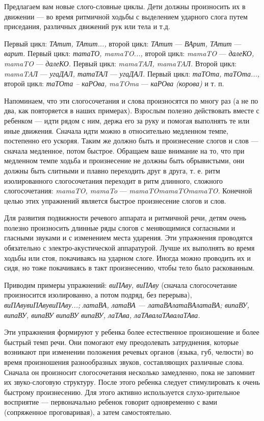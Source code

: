 \documentclass{book}
\renewcommand{\emph}[1]{\textit{#1}}
\begin{document}
Предлагаем вам новые слого-словные циклы. Дети должны произносить их в
движении --- во время ритмичной ходьбы с выделением ударного слога путем
приседания, различных движений рук или тела и т.д.

Первый цикл: \emph{ТАтит, ТАтит...,} второй цикл: \emph{ТАтит} ---
\emph{ВАрит, ТАтит} --- \emph{варит.} Первый цикл: \emph{татаТО,
mamaTO...,} второй цикл: \emph{mamaTO} --- \emph{далеКО, mamaTO} ---
\emph{далеКО.} Первый цикл: \emph{mamaTAЛ, mamaTAЛ.} Второй цикл:
\emph{mamaTAЛ} --- \emph{угаДАЛ, татаТАЛ} --- \emph{угаДАЛ.} Первый
цикл: \emph{таТОта, таТОта...,} второй цикл: \emph{таТОта -- каРОва,
maTOma} --- \emph{каРОва (корова)} и т. п.

Напоминаем, что эти слогосочетания и слова произносятся по многу раз (а
не по два, как повторяется в наших примерах). Взрослым полезно
действовать вместе с ребенком --- идти рядом с ним, держа его за руку и
помогая выполнять те или иные движения. Сначала идти можно в
относительно медленном темпе, постепенно его ускоряя. Таким же должно
быть и произнесение слогов и слов --- сначала медленное, потом быстрое.
Обращаем ваше внимание на то, что при медленном темпе ходьба и
произнесение не должны быть обрывистыми, они должны быть слитными и
плавно переходить друг в друга, т. е. ритм изолированного слогосочетания
переходит в ритм длинного, сложного слогосочетания: \emph{mamaTO,
mamaTo} --- \emph{mamaTOmamaTOmamaTO.} Конечной целью этих упражнений
является быстрое произнесение слогов и слов.

Для развития подвижности речевого аппарата и ритмичной речи, детям очень
полезно произносить длинные ряды слогов с меняющимися согласными и
гласными звуками и с изменением места ударения. Эти упражнения
проводятся обязательно с электро-акустической аппаратурой. Лучше их
выполнять во время ходьбы или стоя, покачиваясь на ударном слоге. Иногда
можно проводить их и сидя, но тоже покачиваясь в такт произнесению,
чтобы тело было раскованным.

Приводим примеры упражнений: \emph{виПАву, виПАву} (сначала
слогосочетание произносится изолированно, а потом подряд, без перерыва),
\emph{виПАвувиПАвувиПАву...; латаВА, латаВА --- латаВАлатаВАлатаВА;
випаВУ, випаВУ, випаВУ випаВУ випаВУ, лаТАва, лаТАвалаТАвалаТАва.}

Эти упражнения формируют у ребенка более естественное произношение и
более быстрый темп речи. Они помогают ему преодолевать затруднения,
которые возникают при изменении положения речевых органов (языка, губ,
челюсти) во время произношения разнообразных звуков, составляющих
различные слова. Сначала он произносит слогосочетания несколько
замедленно, пока не запомнит их звуко-слоговую структуру. После этого
ребенка следует стимулировать к очень быстрому произнесению. Для этого
активно используется слухо-зрительное восприятие --- первоначально
ребенок говорит одновременно с вами (сопряженное проговаривая), а затем
самостоятельно.
\end{document}
